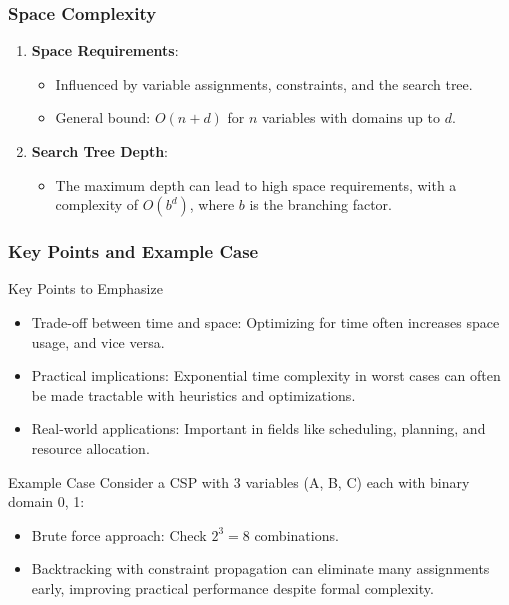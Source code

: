 \documentclass[aspectratio=169]{beamer}
\begin{document}
\begin{frame}[fragile]
    \frametitle{Space Complexity}
    \begin{enumerate}
        \item \textbf{Space Requirements}:
        \begin{itemize}
            \item Influenced by variable assignments, constraints, and the search tree.
            \item General bound: $O(n + d)$ for $n$ variables with domains up to $d$.
        \end{itemize}

        \item \textbf{Search Tree Depth}:
        \begin{itemize}
            \item The maximum depth can lead to high space requirements, with a complexity of $O(b^d)$, where $b$ is the branching factor.
        \end{itemize}
    \end{enumerate}
\end{frame}

\begin{frame}[fragile]
    \frametitle{Key Points and Example Case}
    \begin{block}{Key Points to Emphasize}
        \begin{itemize}
            \item Trade-off between time and space: Optimizing for time often increases space usage, and vice versa.
            \item Practical implications: Exponential time complexity in worst cases can often be made tractable with heuristics and optimizations.
            \item Real-world applications: Important in fields like scheduling, planning, and resource allocation.
        \end{itemize}
    \end{block}

    \begin{block}{Example Case}
        Consider a CSP with 3 variables (A, B, C) each with binary domain {0, 1}:
        \begin{itemize}
            \item Brute force approach: Check $2^3 = 8$ combinations.
            \item Backtracking with constraint propagation can eliminate many assignments early, improving practical performance despite formal complexity.
        \end{itemize}
    \end{block}
\end{frame}
\end{document}
